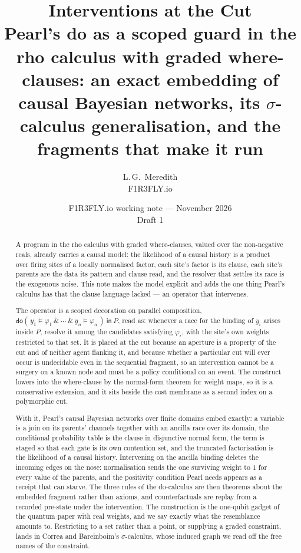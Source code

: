 \documentclass[11pt,a4paper]{article}
\title{\bfseries Interventions at the Cut\\[4pt]
\large Pearl's \textsf{do} as a scoped guard in the rho calculus with graded
where-clauses: an exact embedding of causal Bayesian networks, its
$\sigma$-calculus generalisation, and the fragments that make it run}
\author{L.\,G.\ Meredith\\ \small F1R3FLY.io}
\date{F1R3FLY.io working note --- November 2026\\[2pt]
\normalsize Draft 1}
\theoremstyle{plain}
\theoremstyle{definition}
\theoremstyle{remark}
\newcommand{\dok}{\textsf{do}}
\newcommand{\ink}{\textsf{in}}
\begin{document}
\maketitle

\begin{abstract}
A program in the rho calculus with graded where-clauses, valued over the
non-negative reals, already carries a causal model: the likelihood of a causal
history is a product over firing sites of a locally normalised factor, each
site's factor is its clause, each site's parents are the data its pattern and
clause read, and the resolver that settles its race is the exogenous noise.
This note makes the model explicit and adds the one thing Pearl's calculus has
that the clause language lacked --- an operator that intervenes.

The operator is a scoped decoration on parallel composition,
$\dok(\,y_1 \models \varphi_1 \ \&\ \cdots\ \&\ y_n \models \varphi_n\,)\
\ink\ P$, read as: whenever a race for the binding of $y_i$ arises inside
$P$, resolve it among the candidates satisfying $\varphi_i$, with the site's own
weights restricted to that set. It is placed at the cut because an aperture is a
property of the cut and of neither agent flanking it, and because whether a
particular cut will ever occur is undecidable even in the sequential fragment,
so an intervention cannot be a surgery on a known node and must be a policy
conditional on an event. The construct lowers into the where-clause by the
normal-form theorem for weight maps, so it is a conservative extension, and it
sits beside the cost membrane as a second index on a polymorphic cut.

With it, Pearl's causal Bayesian networks over finite domains embed exactly: a
variable is a join on its parents' channels together with an ancilla race over
its domain, the conditional probability table is the clause in disjunctive
normal form, the term is staged so that each gate is its own contention set,
and the truncated factorisation is the likelihood of a causal history.
Intervening on the ancilla binding deletes the incoming edges on the nose:
normalisation sends the one surviving weight to $1$ for every value of the
parents, and the positivity condition Pearl needs appears as a receipt that
can starve. The three rules of the do-calculus are then theorems about the
embedded fragment rather than axioms, and counterfactuals are replay from a
recorded pre-state under the intervention. The construction is the one-qubit
gadget of the quantum paper with real weights, and we say exactly what the
resemblance amounts to. Restricting to a set rather than a point, or supplying
a graded constraint, lands in Correa and Bareinboim's $\sigma$-calculus, whose
induced graph we read off the free names of the constraint.


\end{abstract}
\end{document}
